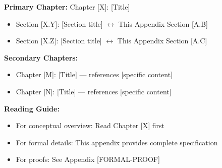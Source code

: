 %
%
%
%
%
%
%


\begin{tcolorbox}[colback=purple!5!white, colframe=purple!75!black, 
    title=Chapter Linkage]

\textbf{Primary Chapter:} Chapter [X]: [Title]
\begin{itemize}[nosep]
\item Section [X.Y]: [Section title] $\leftrightarrow$ This Appendix Section [A.B]
\item Section [X.Z]: [Section title] $\leftrightarrow$ This Appendix Section [A.C]
\end{itemize}

\textbf{Secondary Chapters:}
\begin{itemize}[nosep]
\item Chapter [M]: [Title] --- references [specific content]
\item Chapter [N]: [Title] --- references [specific content]
\end{itemize}

\textbf{Reading Guide:}
\begin{itemize}[nosep]
\item For conceptual overview: Read Chapter [X] first
\item For formal details: This appendix provides complete specification
\item For proofs: See Appendix [FORMAL-PROOF]
\end{itemize}

\end{tcolorbox}

